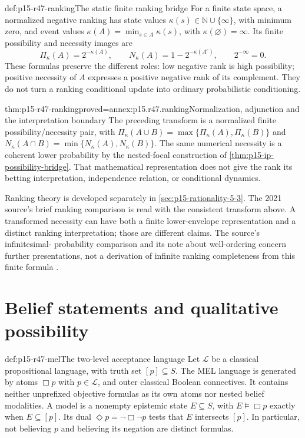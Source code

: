 \begin{hbdefinition}{def:p15-r47-ranking}{The static finite ranking bridge}
For a finite state space, a normalized negative ranking has state values
\(\kappa(s)\in\mathbb N\cup\{\infty\}\), with minimum zero, and event
values \(\kappa(A)=\min_{s\in A}\kappa(s)\), with
\(\kappa(\varnothing)=\infty\). Its finite possibility and necessity
images are
\[
 \Pi_\kappa(A)=2^{-\kappa(A)},\qquad
 N_\kappa(A)=1-2^{-\kappa(A^c)},\qquad 2^{-\infty}=0.
\]
These formulas preserve the different roles: low negative rank is high
possibility; positive necessity of \(A\) expresses a positive negative
rank of its complement. They do not turn a ranking conditional update
into ordinary probabilistic conditioning.
\end{hbdefinition}

\begin{hblemma}{thm:p15-r47-ranking}{proved=annex:p15.r47.ranking}{Normalization, adjunction and the interpretation boundary}
The preceding transform is a normalized finite possibility/necessity pair,
with \(\Pi_\kappa(A\cup B)=\max\{\Pi_\kappa(A),\Pi_\kappa(B)\}\)
and \(N_\kappa(A\cap B)=\min\{N_\kappa(A),N_\kappa(B)\}\).
The same numerical necessity is a coherent lower probability by the
nested-focal construction of \cref{thm:p15-ip-possibility-bridge}.
That mathematical representation does not give the rank its betting
interpretation, independence relation, or conditional dynamics.
\end{hblemma}

Ranking theory is developed separately in
\cref{sec:p15-rationality-5-3}. The 2021 source's brief ranking comparison
is read with the consistent transform above. A transformed necessity can
have both a finite lower-envelope representation and a distinct ranking
interpretation; those are different claims. The source's infinitesimal-
probability comparison and its note about well-ordering concern further
presentations, not a derivation of infinite ranking completeness from this
finite formula \cite[pp.~307, 313]{DuboisPrade2021RepresentingBelief}.

\section{Belief statements and qualitative possibility}
\label{sec:p15-r47-modal}

\begin{hbdefinition}{def:p15-r47-mel}{The two-level acceptance language}
Let \(\mathcal L\) be a classical propositional language, with truth set
\([p]\subseteq S\). The MEL language is generated by atoms \(\Box p\)
with \(p\in\mathcal L\), and outer classical Boolean connectives.
It contains neither unprefixed objective formulas as its own atoms nor
nested belief modalities. A model is a nonempty epistemic state
\(E\subseteq S\), with \(E\models\Box p\) exactly when \(E\subseteq[p]\).
Its dual \(\Diamond p=\neg\Box\neg p\) tests that \(E\) intersects
\([p]\). In particular, not believing \(p\) and believing its negation
are distinct formulas.
\end{hbdefinition}

